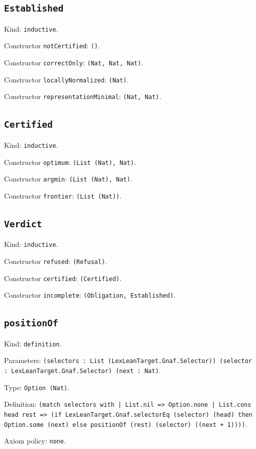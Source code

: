 \documentclass[11pt]{article}
\begin{document}
\subsection*{\texttt{Established}}
\noindent Kind: \texttt{inductive}.\par
\noindent Constructor \texttt{notCertified}: \texttt{()}.\par
\noindent Constructor \texttt{correctOnly}: \texttt{(Nat, Nat, Nat)}.\par
\noindent Constructor \texttt{locallyNormalized}: \texttt{(Nat)}.\par
\noindent Constructor \texttt{representationMinimal}: \texttt{(Nat, Nat)}.\par
\subsection*{\texttt{Certified}}
\noindent Kind: \texttt{inductive}.\par
\noindent Constructor \texttt{optimum}: \texttt{(List (Nat), Nat)}.\par
\noindent Constructor \texttt{argmin}: \texttt{(List (Nat), Nat)}.\par
\noindent Constructor \texttt{frontier}: \texttt{(List (Nat))}.\par
\subsection*{\texttt{Verdict}}
\noindent Kind: \texttt{inductive}.\par
\noindent Constructor \texttt{refused}: \texttt{(Refusal)}.\par
\noindent Constructor \texttt{certified}: \texttt{(Certified)}.\par
\noindent Constructor \texttt{incomplete}: \texttt{(Obligation, Established)}.\par
\subsection*{\texttt{positionOf}}
\noindent Kind: \texttt{definition}.\par
\noindent Parameters: \texttt{(selectors : List (LexLeanTarget.Gnaf.Selector)) (selector : LexLeanTarget.Gnaf.Selector) (next : Nat)}.\par
\noindent Type: \texttt{Option (Nat)}.\par
\noindent Definition: \texttt{(match selectors with | List.nil => Option.none | List.cons head rest => (if LexLeanTarget.Gnaf.selectorEq (selector) (head) then Option.some (next) else positionOf (rest) (selector) ((next + 1))))}.\par
\noindent Axiom policy: \texttt{none}.\par
\end{document}
